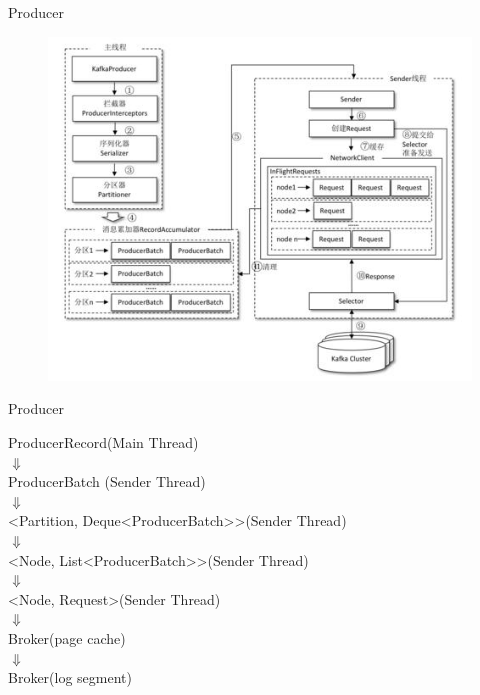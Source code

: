 \begin{frame}[plain,t]{Producer} %
     \\
    \vspace{2ex}
    \begin{figure}
        \centering
        \includegraphics[width=0.8\linewidth]{image/0203}
        \label{fig:0203}
    \end{figure}
    

\end{frame}
\begin{frame}[plain,t]{Producer} %
     \\
    \vspace{2ex}
    \begin{center}
        ProducerRecord(Main Thread) \\
        $\Downarrow$ \\
        ProducerBatch (Sender Thread) \\
        $\Downarrow$ \\
        <Partition, Deque<ProducerBatch>{}>(Sender Thread) \\
        $\Downarrow$ \\
        <Node, List<ProducerBatch>{}>(Sender Thread) \\
        $\Downarrow$ \\
        <Node, Request>(Sender Thread) \\
        {\color{red}$\Downarrow$} \\
        Broker(page cache) \\
        $\Downarrow$ \\
        Broker(log segment)
    \end{center}
    
\end{frame}
